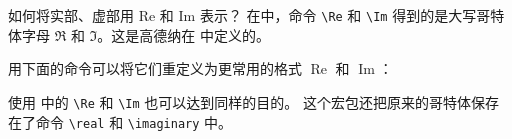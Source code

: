 \begin{myQA}{如何将实部、虚部用 Re 和 Im 表示？}
	在\LaTeXTeX 中，命令 \verb|\Re| 和 \verb|\Im| 得到的是大写哥特体字母
	$\Re$ 和 $\Im$。这是高德纳在  中定义的。
	
	用下面的命令可以将它们重定义为更常用的格式 $\operatorname{Re}$
	和 $\operatorname{Im}$：
\begin{myCode}[|]
\renewcommand{\Re}{\operatorname{Re}}
\renewcommand{\Im}{\operatorname{Im}}
\end{myCode}
	
	使用  中的 \verb|\Re| 和 \verb|\Im| 也可以达到同样的目的。
	这个宏包还把原来的哥特体保存在了命令 \verb|\real| 和 \verb|\imaginary| 中。
	
\end{myQA}